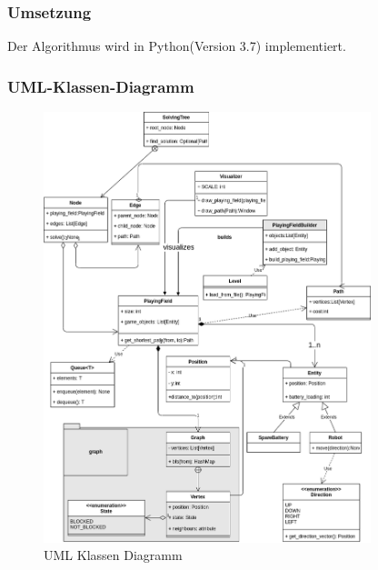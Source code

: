 \documentclass[a4paper,12pt,arial]{scrartcl}
\begin{document}
\subsubsection{Umsetzung}
Der Algorithmus wird in Python(Version 3.7) implementiert.


\newpage
\subsubsection{UML-Klassen-Diagramm}
\begin{figure}[h]
    \centering
    \includegraphics[width=0.85\textwidth]{uml_diagramm.png}
    \caption{UML Klassen Diagramm}
    \label{fig:uml}
\end{figure}
\newpage
\end{document}
